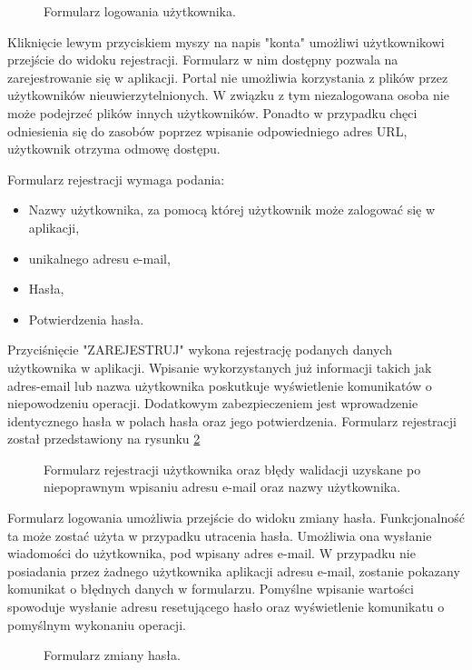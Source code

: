 \begin{figure}
	\centering
	\caption{Formularz logowania użytkownika.}
	\label{fig:6}
\end{figure}

Kliknięcie lewym przyciskiem myszy na napis "konta" umożliwi użytkownikowi przejście do widoku rejestracji. Formularz w nim dostępny pozwala na zarejestrowanie się w aplikacji. Portal nie umożliwia korzystania z plików przez użytkowników nieuwierzytelnionych. W związku z tym niezalogowana osoba nie może podejrzeć plików innych użytkowników. Ponadto w przypadku chęci odniesienia się do zasobów poprzez wpisanie odpowiedniego adres URL, użytkownik otrzyma odmowę dostępu. 

Formularz rejestracji wymaga podania:
\begin{itemize}  
	\item Nazwy użytkownika, za pomocą której użytkownik może zalogować się w aplikacji,
	\item unikalnego adresu e-mail,
	\item Hasła,
	\item Potwierdzenia hasła.
\end{itemize}

Przyciśnięcie "ZAREJESTRUJ" wykona rejestrację podanych danych użytkownika w aplikacji. Wpisanie wykorzystanych już informacji takich jak adres-email lub nazwa użytkownika poskutkuje wyświetlenie komunikatów o niepowodzeniu operacji. Dodatkowym zabezpieczeniem jest wprowadzenie identycznego hasła w polach hasła oraz jego potwierdzenia. Formularz rejestracji został przedstawiony na rysunku \ref{fig:7} 
\\
\begin{figure}
	\centering
	\caption{Formularz rejestracji użytkownika oraz błędy walidacji uzyskane po niepoprawnym wpisaniu adresu e-mail oraz nazwy użytkownika.}
	\label{fig:7}
\end{figure}

Formularz logowania umożliwia przejście do widoku zmiany hasła. Funkcjonalność ta może zostać użyta w przypadku utracenia hasła. Umożliwia ona wysłanie wiadomości do użytkownika, pod wpisany adres e-mail. W przypadku nie posiadania przez żadnego użytkownika aplikacji adresu e-mail, zostanie pokazany komunikat o błędnych danych w formularzu. Pomyślne wpisanie wartości spowoduje wysłanie adresu resetującego hasło oraz wyświetlenie komunikatu o pomyślnym wykonaniu operacji.
\begin{figure}[!h]
	\centering
	\caption{Formularz zmiany hasła.}
	\label{fig:8}
\end{figure}

